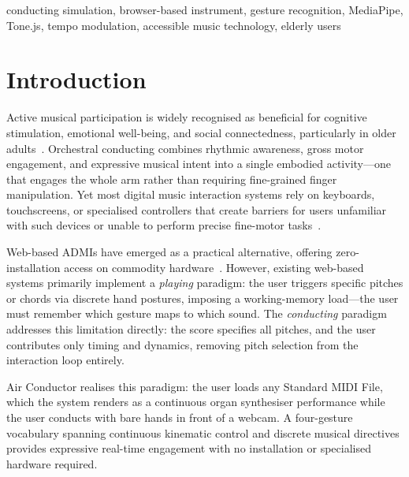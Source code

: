 \documentclass[conference]{IEEEtran}
\begin{document}
\begin{IEEEkeywords}
conducting simulation, browser-based instrument, gesture recognition,
MediaPipe, Tone.js, tempo modulation, accessible music technology,
elderly users
\end{IEEEkeywords}

\section{Introduction}

Active musical participation is widely recognised as beneficial for
cognitive stimulation, emotional well-being, and social connectedness,
particularly in older adults~\cite{rw8,rw9}. Orchestral conducting
combines rhythmic awareness, gross motor engagement, and expressive
musical intent into a single embodied activity---one that engages the
whole arm rather than requiring fine-grained finger manipulation. Yet
most digital music interaction systems rely on keyboards, touchscreens,
or specialised controllers that create barriers for users unfamiliar
with such devices or unable to perform precise fine-motor
tasks~\cite{rw1}.

Web-based ADMIs have emerged as a practical alternative, offering
zero-installation access on commodity hardware~\cite{rw14}. However,
existing web-based systems primarily implement a \emph{playing}
paradigm: the user triggers specific pitches or chords via discrete hand
postures, imposing a working-memory load---the user must remember which
gesture maps to which sound. The \emph{conducting} paradigm addresses
this limitation directly: the score specifies all pitches, and the user
contributes only timing and dynamics, removing pitch selection from the
interaction loop entirely.

Air Conductor realises this paradigm: the user loads any Standard MIDI
File, which the system renders as a continuous organ synthesiser
performance while the user conducts with bare hands in front of a
webcam. A four-gesture vocabulary spanning continuous kinematic control
and discrete musical directives provides expressive real-time engagement
with no installation or specialised hardware required.
\end{document}

